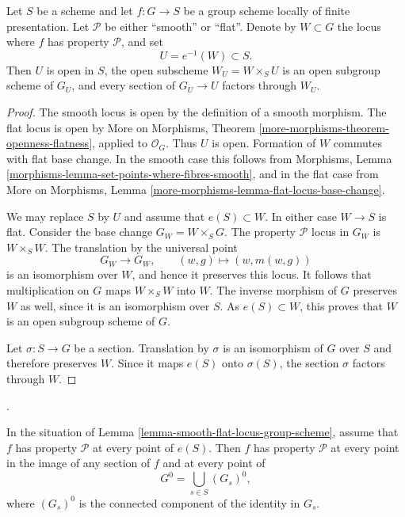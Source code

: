 \begin{lemma}
\label{lemma-smooth-flat-locus-group-scheme}
Let $S$ be a scheme and let $f : G \to S$ be a group scheme locally of
finite presentation. Let $\mathcal{P}$ be either ``smooth'' or ``flat''.
Denote by $W \subset G$ the locus where $f$ has property $\mathcal{P}$,
and set
$$
U = e^{-1}(W) \subset S.
$$
Then $U$ is open in $S$, the open subscheme
$W_U = W \times_S U$ is an open subgroup scheme of $G_U$, and every
section of $G_U \to U$ factors through $W_U$.
\end{lemma}

\begin{proof}
The smooth locus is open by the definition of a smooth morphism. The
flat locus is open by More on Morphisms, Theorem
\ref{more-morphisms-theorem-openness-flatness}, applied to
$\mathcal{O}_G$. Thus $U$ is open. Formation of $W$ commutes with flat
base change. In the smooth case this follows from Morphisms, Lemma
\ref{morphisms-lemma-set-points-where-fibres-smooth}, and in the flat
case from More on Morphisms, Lemma
\ref{more-morphisms-lemma-flat-locus-base-change}.

We may replace $S$ by $U$ and assume that $e(S) \subset W$. In either
case $W \to S$ is flat. Consider the base change $G_W = W \times_S G$.
The property $\mathcal{P}$ locus in $G_W$ is $W \times_S W$. The
translation by the universal point
$$
G_W \longrightarrow G_W, \qquad (w, g) \longmapsto (w, m(w, g))
$$
is an isomorphism over $W$, and hence it preserves this locus. It
follows that multiplication on $G$ maps $W \times_S W$ into $W$.
The inverse morphism of $G$ preserves $W$ as well, since it is an
isomorphism over $S$. As $e(S) \subset W$, this proves that $W$ is an
open subgroup scheme of $G$.

Let $\sigma : S \to G$ be a section. Translation by $\sigma$ is an
isomorphism of $G$ over $S$ and therefore preserves $W$. Since it maps
$e(S)$ onto $\sigma(S)$, the section $\sigma$ factors through $W$.
\end{proof}

\begin{lemma}
\label{lemma-smooth-flat-along-identity-component}
\begin{reference}
\cite[Expos\'e 236, Corollary 1.12 and Proposition 2.10(i),
pp. 230 and 235--236]{FGA}.
\end{reference}
In the situation of Lemma \ref{lemma-smooth-flat-locus-group-scheme},
assume that $f$ has property $\mathcal{P}$ at every point of $e(S)$.
Then $f$ has property $\mathcal{P}$ at every point in the image of any
section of $f$ and at every point of
$$
G^0 = \bigcup_{s \in S} (G_s)^0,
$$
where $(G_s)^0$ is the connected component of the identity in $G_s$.
\end{lemma}

